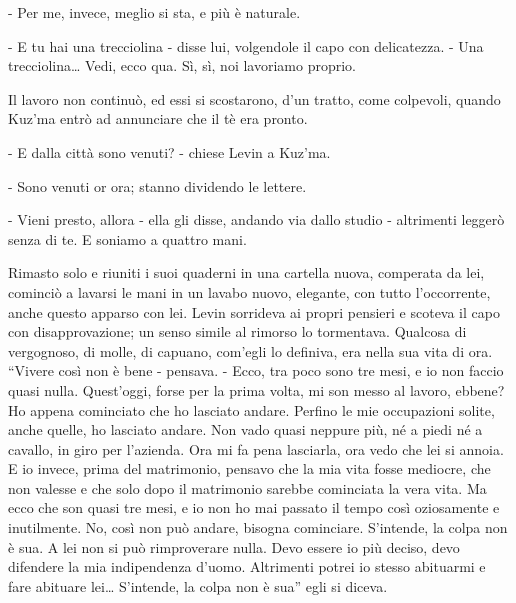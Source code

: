 - Per me, invece, meglio si sta, e più è naturale. 

- E tu hai una trecciolina - disse lui, volgendole il capo con delicatezza. - Una trecciolina\ldots{} Vedi, ecco qua. Sì, sì, noi lavoriamo proprio. 

Il lavoro non continuò, ed essi si scostarono, d'un tratto, come colpevoli, quando Kuz'ma entrò ad annunciare che il tè era pronto. 

- E dalla città sono venuti? - chiese Levin a Kuz'ma. 

- Sono venuti or ora; stanno dividendo le lettere. 

- Vieni presto, allora - ella gli disse, andando via dallo studio - altrimenti leggerò senza di te. E soniamo a quattro mani. 

Rimasto solo e riuniti i suoi quaderni in una cartella nuova, comperata da lei, cominciò a lavarsi le mani in un lavabo nuovo, elegante, con tutto l'occorrente, anche questo apparso con lei. Levin sorrideva ai propri pensieri e scoteva il capo con disapprovazione; un senso simile al rimorso lo tormentava. Qualcosa di vergognoso, di molle, di capuano, com'egli lo definiva, era nella sua vita di ora. ``Vivere così non è bene - pensava. - Ecco, tra poco sono tre mesi, e io non faccio quasi nulla. Quest'oggi, forse per la prima volta, mi son messo al lavoro, ebbene? Ho appena cominciato che ho lasciato andare. Perfino le mie occupazioni solite, anche quelle, ho lasciato andare. Non vado quasi neppure più, né a piedi né a cavallo, in giro per l'azienda. Ora mi fa pena lasciarla, ora vedo che lei si annoia. E io invece, prima del matrimonio, pensavo che la mia vita fosse mediocre, che non valesse e che solo dopo il matrimonio sarebbe cominciata la vera vita. Ma ecco che son quasi tre mesi, e io non ho mai passato il tempo così oziosamente e inutilmente. No, così non può andare, bisogna cominciare. S'intende, la colpa non è sua. A lei non si può rimproverare nulla. Devo essere io più deciso, devo difendere la mia indipendenza d'uomo. Altrimenti potrei io stesso abituarmi e fare abituare lei\ldots{} S'intende, la colpa non è sua'' egli si diceva. 

